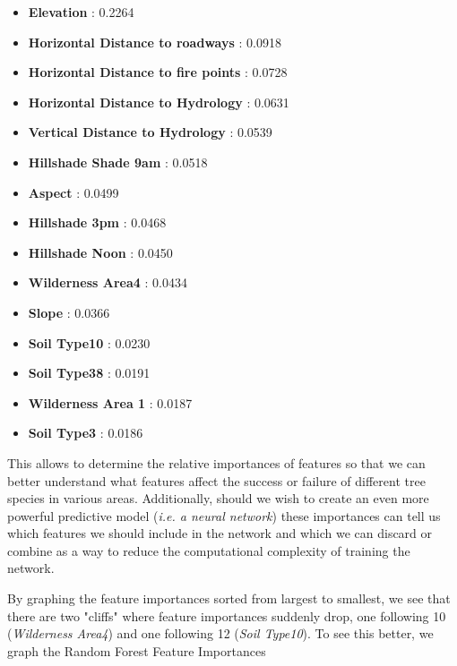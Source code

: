 \documentclass{article}[12pt]
\numberwithin{equation}{subsection}
\begin{document}
\begin{flushleft}
\begin{itemize}
\item \textbf{Elevation} : 0.2264
\item \textbf{Horizontal Distance to roadways} : 0.0918
\item \textbf{Horizontal Distance to fire points} : 0.0728
\item \textbf{Horizontal Distance to Hydrology} : 0.0631
\item \textbf{Vertical Distance to Hydrology} : 0.0539
\item \textbf{Hillshade Shade 9am} : 0.0518
\item \textbf{Aspect} : 0.0499
\item \textbf{Hillshade 3pm} : 0.0468
\item \textbf{Hillshade Noon} : 0.0450
\item \textbf{Wilderness Area4} : 0.0434
\item \textbf{Slope} : 0.0366
\item \textbf{Soil Type10} : 0.0230
\item \textbf{Soil Type38} : 0.0191
\item \textbf{Wilderness Area 1} : 0.0187
\item \textbf{Soil Type3} : 0.0186
\end{itemize}

This allows to determine the relative importances of features so that we can better understand what features affect the success or failure of different tree species in various areas.  Additionally, should we wish to create an even more powerful predictive model (\emph{i.e. a neural network}) these importances can tell us which features we should include in the network and which we can discard or combine as a way to reduce the computational complexity of training the network.  \newline

By graphing the feature importances sorted from largest to smallest, we see that there are two "cliffs" where feature importances suddenly drop, one following 10 (\emph{Wilderness Area4}) and one following 12 (\emph{Soil Type10}).  To see this better, we graph the Random Forest Feature Importances 

\end{flushleft}
\end{document}
